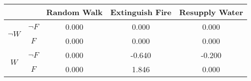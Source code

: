 \begin{center}
\begin{tabular}{|c|c|c|c|c|}
  \hline
  &   & Random Walk & Extinguish Fire & Resupply Water\\
  \hline
  \multirow{2}{*}{$\neg W$} & $\neg F$ & 0.000 & 0.000 & 0.000\\
  \cline{2-5}
   & $F$ & 0.000 & 0.000 & 0.000\\
  \hline
  \multirow{2}{*}{$W$} & $\neg F$ & 0.000 & -0.640 & -0.200\\
  \cline{2-5}
   & $F$ & 0.000 & 1.846 & 0.000\\
  \hline
\end{tabular}
\end{center}
